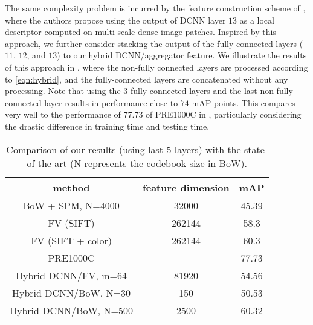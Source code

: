 \documentclass{article}
\begin{document}
The same complexity problem is incurred by the feature construction scheme of \cite{gong2014multi}, where the authors propose using the output of DCNN layer $13$ as a local descriptor computed on multi-scale dense image patches. Inspired by this approach, we further consider stacking the output of the fully connected layers ($11$, $12$, and $13$) to our hybrid DCNN/aggregator feature. We illustrate the results of this approach in , where the non-fully connected layers are processed according to \eqref{eqn:hybrid}, and the fully-connected layers are concatenated without any processing. Note that using the $3$ fully connected layers and the last non-fully connected layer results in performance close to $74$ mAP points. This compares very well to the performance of $77.73$ of PRE1000C in , particularly considering the drastic difference in training time and testing time.


\begin{table}[!ht]
\centering
\begin{tabular}{c|c|c}
\hline
method& feature dimension & mAP\\
\hline
BoW + SPM, N=4000 \cite{Chatfield2011} & 32000 & 45.39\\
FV (SIFT) \cite{perronnin}& 262144 & 58.3\\
FV (SIFT + color) \cite{perronnin} & 262144 & 60.3\\
PRE1000C \cite{Oquaba} &&77.73\\
\hline
Hybrid DCNN/FV, m=64 &81920&54.56\\
Hybrid DCNN/BoW, N=30 & 150&50.53\\
Hybrid DCNN/BoW, N=500 & 2500&60.32\\

\hline
\end{tabular}
\caption{Comparison of our results (using last 5 layers) with the state-of-the-art (N represents the codebook size in BoW).}
\label{compare}
\end{table}
\end{document}
